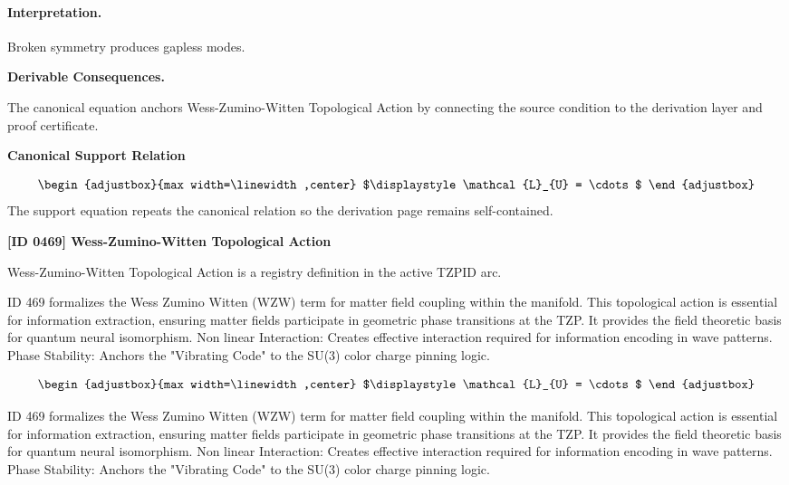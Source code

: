 \paragraph{Interpretation.}
Broken symmetry produces gapless modes.

\par\vspace{0.35em}
\noindent\textbf{Derivable Consequences.}\quad
\begingroup
\footnotesize
\raggedright
The canonical equation anchors Wess-Zumino-Witten Topological Action by connecting the source condition to the derivation layer and proof certificate.
\par\endgroup

\noindent\textbf{Canonical Support Relation}\par
\[
\begin{adjustbox}{max width=\linewidth,center}
$\displaystyle
\mathcal{L}_{U} = \cdots
$
\end{adjustbox}
\]
\noindent The support equation repeats the canonical relation so the derivation page remains self-contained.\par

\clearpage
\noindent\textbf{[ID 0469] Wess-Zumino-Witten Topological Action}\par
\vspace{0.35em}
\begingroup\small
{}
Wess-Zumino-Witten Topological Action is a registry definition in the active TZPID arc.

ID 469 formalizes the Wess Zumino Witten (WZW) term for matter field coupling within the manifold. This topological action is essential for information extraction, ensuring matter fields participate in geometric phase transitions at the TZP. It provides the field theoretic basis for quantum neural isomorphism. Non linear Interaction: Creates effective interaction required for information encoding in wave patterns. Phase Stability: Anchors the "Vibrating Code" to the SU(3) color charge pinning logic.

\[
\begin{adjustbox}{max width=\linewidth,center}
$\displaystyle
\mathcal{L}_{U} = \cdots
$
\end{adjustbox}
\]

ID 469 formalizes the Wess Zumino Witten (WZW) term for matter field coupling within the manifold. This topological action is essential for information extraction, ensuring matter fields participate in geometric phase transitions at the TZP. It provides the field theoretic basis for quantum neural isomorphism. Non linear Interaction: Creates effective interaction required for information encoding in wave patterns. Phase Stability: Anchors the "Vibrating Code" to the SU(3) color charge pinning logic.

